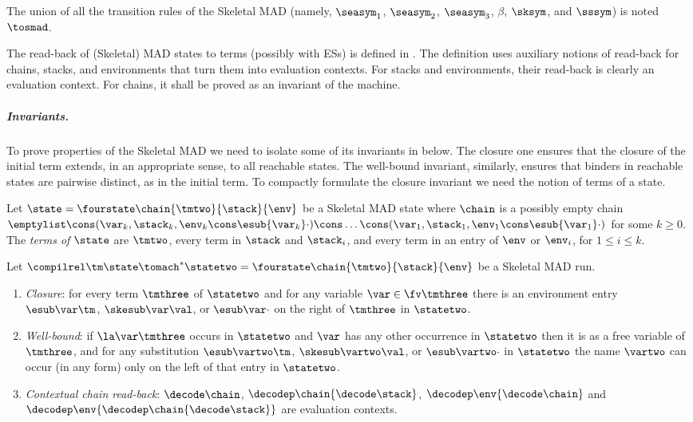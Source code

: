 The union of all the transition rules of the Skeletal MAD (namely, $\seasym_1$, $\seasym_2$, $\seasym_3$, $\beta$, $\sksym$, and $\sssym$) is noted $\tosmad$.


The read-back of (Skeletal) MAD states to terms (possibly with ESs) is defined in . The definition uses auxiliary notions of read-back for chains, stacks, and environments that turn them into \cbneed evaluation contexts. For stacks and environments, their read-back is clearly an evaluation context. For chains, it shall be proved as an invariant of the machine.

\subparagraph{Invariants.} To prove properties of the Skeletal MAD we need to isolate some of its invariants in  below. The closure one ensures that the closure of the initial term extends, in an appropriate sense, to all reachable states. The well-bound invariant, similarly, ensures that binders in reachable states are pairwise distinct, as in the initial term. To compactly formulate the closure invariant we need the notion of terms of a state. 

\begin{definition}
Let $\state=\fourstate\chain{\tmtwo}{\stack}{\env}$ be a Skeletal MAD state where $\chain$ is a possibly empty chain $ \emptylist\cons(\var_k, \stack_k, \env_k\cons\esub{\var_k}\cdot)\cons\ldots\cons(\var_1, \stack_1, \env_1\cons\esub{\var_1}\cdot)$ for some $k\geq0$. 
The \emph{terms of $\state$} are $\tmtwo$, every term in $\stack$ and $\stack_i$, and every term in an entry of $\env$ or $\env_i$, for $1\leq i \leq k$. 
\end{definition}

\begin{toappendix}
\begin{lemma}
\label{l:skeletal-mam-qual-invariants}
Let $\compilrel\tm\state \tomach^*\statetwo=\fourstate\chain{\tmtwo}{\stack}{\env}$ be a Skeletal MAD run.
\begin{enumerate}
\item \emph{Closure}: for every term $\tmthree$ of $\statetwo$  and for any variable $\var\in\fv\tmthree$ there is an environment entry $\esub\var\tm$, $\skesub\var\val$, or $\esub\var\cdot$ on the right of $\tmthree$ in $\statetwo$.
\item \emph{Well-bound}: if $\la\var\tmthree$ occurs in $\statetwo$ and $\var$ has any other
occurrence in $\statetwo$ then it is as a free variable of $\tmthree$, and for any substitution $\esub\vartwo\tm$, $\skesub\vartwo\val$, or $\esub\vartwo\cdot$ in $\statetwo$ the name $\vartwo$ can occur (in any form) only on the left of that entry in $\statetwo$.

\item \emph{Contextual chain read-back}: $\decode\chain$, $\decodep\chain{\decode\stack}$, $\decodep\env{\decode\chain}$ and $\decodep\env{\decodep\chain{\decode\stack}}$ are \cbneed evaluation contexts.
\end{enumerate}
\end{lemma}
\end{toappendix}



